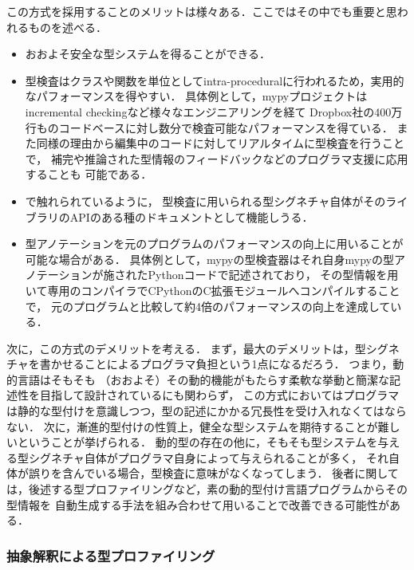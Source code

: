 この方式を採用することのメリットは様々ある．ここではその中でも重要と思われるものを述べる．
\begin{itemize}
  \item おおよそ安全な型システムを得ることができる．
  \item 型検査はクラスや関数を単位としてintra-proceduralに行われるため，実用的なパフォーマンスを得やすい．
        具体例として，mypyプロジェクトはincremental checkingなど様々なエンジニアリングを経て
        Dropbox社の400万行ものコードベースに対し数分で検査可能なパフォーマンスを得ている\cite{dropbox}．
        また同様の理由から編集中のコードに対してリアルタイムに型検査を行うことで，
        補完や推論された型情報のフィードバックなどのプログラマ支援に応用することも
        可能である\cite{flow, typescript}．
  \item \cite{ruby-progress-report}で触れられているように，
        型検査に用いられる型シグネチャ自体がそのライブラリのAPIのある種のドキュメントとして機能しうる．
  \item 型アノテーションを元のプログラムのパフォーマンスの向上に用いることが可能な場合がある．
        具体例として，mypyの型検査器はそれ自身mypyの型アノテーションが施されたPythonコードで記述されており，
        その型情報を用いて専用のコンパイラでCPythonのC拡張モジュールへコンパイルすることで，
        元のプログラムと比較して約4倍のパフォーマンスの向上を達成している\cite{dropbox}．
\end{itemize}

次に，この方式のデメリットを考える．
まず，最大のデメリットは，型シグネチャを書かせることによるプログラマ負担という1点になるだろう．
つまり，動的言語はそもそも
（おおよそ）その動的機能がもたらす柔軟な挙動と簡潔な記述性を目指して設計されているにも関わらず，
この方式においてはプログラマは静的な型付けを意識しつつ，型の記述にかかる冗長性を受け入れなくてはならない．
次に，漸進的型付けの性質上，健全な型システムを期待することが難しいということが挙げられる．
動的型の存在の他に，そもそも型システムを与える型シグネチャ自体がプログラマ自身によって与えられることが多く，
それ自体が誤りを含んでいる場合，型検査に意味がなくなってしまう．
後者に関しては，後述する型プロファイリングなど，素の動的型付け言語プログラムからその型情報を
自動生成する手法を組み合わせて用いることで改善できる可能性がある\footnotemark．

\subsubsection{抽象解釈による型プロファイリング} \label{subsubsection:type-profiling}


